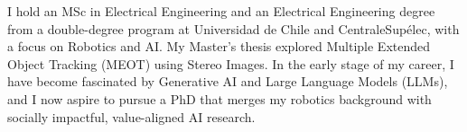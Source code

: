 
I hold an MSc in Electrical Engineering and an Electrical Engineering degree from a double-degree program at Universidad de Chile and CentraleSupélec, with a focus on Robotics and AI. My Master’s thesis explored Multiple Extended Object Tracking (MEOT) using Stereo Images. In the early stage of my career, I have become fascinated by Generative AI and Large Language Models (LLMs), and I now aspire to pursue a PhD that merges my robotics background with socially impactful, value-aligned AI research.
